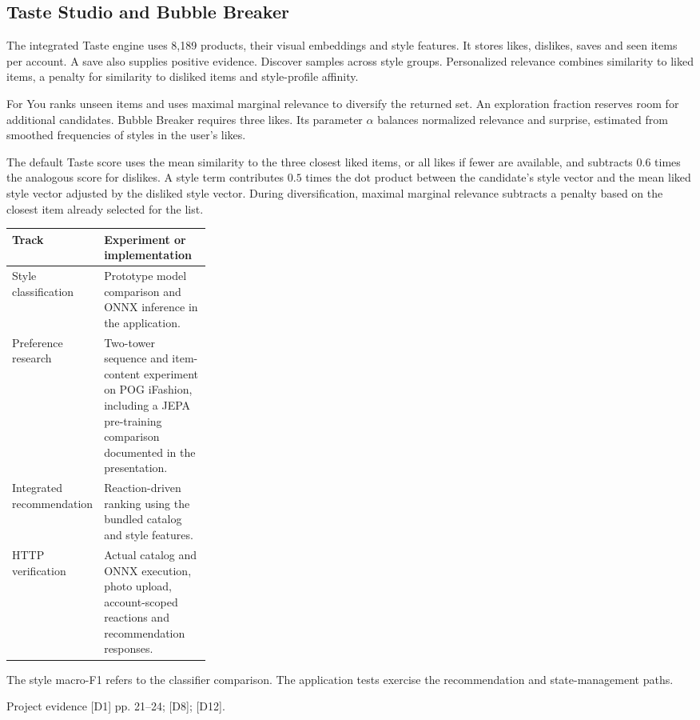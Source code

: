 \documentclass[11pt,a4paper]{article}
\newcommand{\src}[1]{\par{\footnotesize\textcolor{muted}{Project evidence #1.}}\par}
\begin{document}
\subsection*{Taste Studio and Bubble Breaker}
The integrated Taste engine uses 8,189 products, their visual embeddings and style features. It stores likes, dislikes, saves and seen items per account. A save also supplies positive evidence. Discover samples across style groups. Personalized relevance combines similarity to liked items, a penalty for similarity to disliked items and style-profile affinity.

For You ranks unseen items and uses maximal marginal relevance to diversify the returned set. An exploration fraction reserves room for additional candidates. Bubble Breaker requires three likes. Its parameter \(\alpha\) balances normalized relevance and surprise, estimated from smoothed frequencies of styles in the user's likes.

The default Taste score uses the mean similarity to the three closest liked items, or all likes if fewer are available, and subtracts \(0.6\) times the analogous score for dislikes. A style term contributes \(0.5\) times the dot product between the candidate's style vector and the mean liked style vector adjusted by the disliked style vector. During diversification, maximal marginal relevance subtracts a penalty based on the closest item already selected for the list.

\begin{tabularx}{\linewidth}{@{}L{0.29\linewidth}Y@{}}
\toprule
\textbf{Track} & \textbf{Experiment or implementation} \\
\midrule
Style classification & Prototype model comparison and ONNX inference in the application. \\
Preference research & Two-tower sequence and item-content experiment on POG iFashion, including a JEPA pre-training comparison documented in the presentation. \\
Integrated recommendation & Reaction-driven ranking using the bundled catalog and style features. \\
HTTP verification & Actual catalog and ONNX execution, photo upload, account-scoped reactions and recommendation responses. \\
\bottomrule
\end{tabularx}

The style macro-F1 refers to the classifier comparison. The application tests exercise the recommendation and state-management paths.
\src{[D1] pp. 21--24; [D8]; [D12]}
\end{document}
